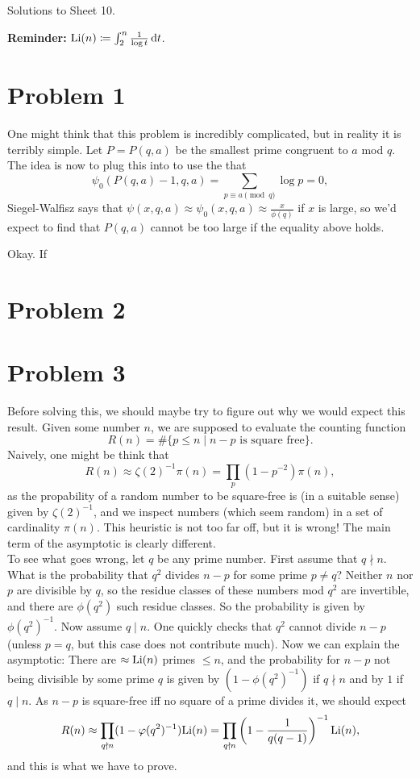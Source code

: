 \documentclass[a4paper,11pt]{article}
\author{Max von Consbruch}
\begin{document}
\begin{center}
    \huge{Solutions to Sheet 10.}
\end{center}

\textbf{Reminder:} $\mathrm{Li}(n) \coloneqq \int_2^n \frac 1{\log t} \mathrm{\,d} t$. 

\section*{Problem 1}
One might think that this problem is incredibly complicated, but in reality it 
is terribly simple. Let $P = P(q,a)$ be the smallest prime congruent to $a$ mod $q$.
The idea is now to plug this into to use the that 
\[
    \psi_0(P(q,a)-1,q,a) = \sum_{p \equiv a \pmod q} \log p = 0,
\]
Siegel-Walfisz says that $\psi(x,q,a) \approx \psi_0(x,q,a) \approx \frac
x{\phi(q)}$ if $x$ is large, so we'd expect to find that $P(q,a)$ cannot be too
large if the equality above holds.

Okay. If 

\section*{Problem 2}
\section*{Problem 3}
Before solving this, we should maybe try to figure out why we would expect this result. 
Given some number $n$, we are supposed to evaluate the counting function
\[
    R(n) = \# \{p \leq n \mid \text{$n-p$ is square free}\}.
\]
Naively, one might be think that 
$$R(n) \approx \zeta(2)^{-1}\pi(n) = \prod_{p} (1 - p^{-2}) \pi(n),$$
as the propability of a random number to be square-free is (in a suitable sense) given by
$\zeta(2)^{-1}$, and we inspect numbers (which seem random) in a set of cardinality 
$\pi(n)$. This heuristic is not too far off, but it is wrong! The main term of the 
asymptotic is clearly different. \\ 
To see what goes wrong, let $q$ be any prime
number.  First assume that $q \nmid n$. What is the probability that $q^2$ divides $n-p$
for some prime $p\neq q$?  Neither $n$ nor $p$ are divisible by $q$, so the
residue classes of these
numbers mod $q^2$ are invertible, and there are $\phi(q^2)$ such residue
classes.  So the probability is given by $\phi(q^2)^{-1}$.  Now assume $q \mid
n$. One quickly checks that $q^2$ cannot divide $n-p$
(unless $p = q$, but this case does not contribute much). Now we can explain
the asymptotic: There are
$\approx \mathrm{Li}(n)$ primes $\leq n$, and the probability for $n-p$ not being divisible by 
some prime $q$ is given by $(1-\phi(q^2)^{-1})$ if $q \nmid n$ and by $1$ if $q \mid n$. 
As $n-p$ is square-free iff no square of a prime divides it, we should expect
\[
    R(n) \approx \prod_{q \nmid n}(1-\varphi(q^2)^{-1}) \mathrm{Li}(n) = \prod_{q
    \nmid n}\left(1-\frac1{q(q-1)}\right)^{-1} \mathrm{Li}(n),
\]
and this is what we have to prove.
\end{document}
